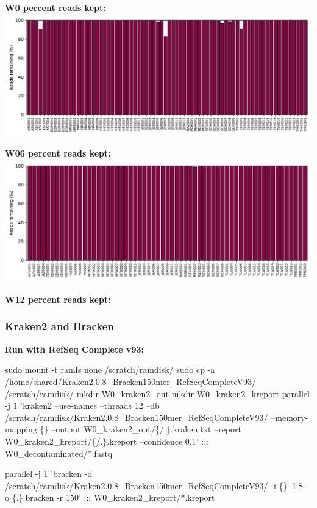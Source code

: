 \documentclass[
]{article}
\newenvironment{Shaded}{\begin{snugshade}}{\end{snugshade}}
\newcommand{\ExtensionTok}[1]{#1}
\newcommand{\FunctionTok}[1]{\textcolor[rgb]{0.00,0.00,0.00}{#1}}
\newcommand{\NormalTok}[1]{#1}
\newcommand{\StringTok}[1]{\textcolor[rgb]{0.31,0.60,0.02}{#1}}
\begin{document}
\textbf{W0 percent reads kept:}
\includegraphics{Fungal-metagenome_files/figure-latex/w0_kneaddata-1.pdf}

\textbf{W06 percent reads kept:}
\includegraphics{Fungal-metagenome_files/figure-latex/w06_kneaddata-1.pdf}

\textbf{W12 percent reads kept:}

\hypertarget{kraken2-and-bracken}{%
\subsubsection{Kraken2 and Bracken}\label{kraken2-and-bracken}}

\textbf{Run with RefSeq Complete v93:}

\begin{Shaded}
\begin{Highlighting}[]
\FunctionTok{sudo}\NormalTok{ mount -t ramfs none /scratch/ramdisk/}
\FunctionTok{sudo}\NormalTok{ cp -a /home/shared/Kraken2.0.8_Bracken150mer_RefSeqCompleteV93/ /scratch/ramdisk/}
\FunctionTok{mkdir}\NormalTok{ W0_kraken2_out}
\FunctionTok{mkdir}\NormalTok{ W0_kraken2_kreport}
\ExtensionTok{parallel}\NormalTok{ -j 1 }\StringTok{'kraken2 --use-names --threads 12 --db /scratch/ramdisk/Kraken2.0.8_Bracken150mer_RefSeqCompleteV93/ --memory-mapping \{\} --output W0_kraken2_out/\{/.\}.kraken.txt --report W0_kraken2_kreport/\{/.\}.kreport --confidence 0.1'}\NormalTok{ ::: W0_decontaminated/*.fastq}

\ExtensionTok{parallel}\NormalTok{ -j 1 }\StringTok{'bracken -d /scratch/ramdisk/Kraken2.0.8_Bracken150mer_RefSeqCompleteV93/ -i \{\} -l S -o \{.\}.bracken -r 150'}\NormalTok{ ::: W0_kraken2_kreport/*.kreport}
\end{Highlighting}
\end{Shaded}
\end{document}
